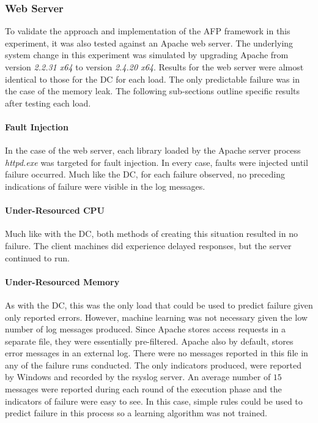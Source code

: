 \subsubsection{Web Server}
To validate the approach and implementation of the \ac{AFP} framework in this
experiment, it was also tested against an Apache web server.  The underlying
system change in this experiment was simulated by upgrading Apache from version
\emph{2.2.31 x64} to version \emph{2.4.20 x64}.  Results for the web server
were almost identical to those for the \ac{DC} for each load.  The only
predictable failure was in the case of the memory leak.  The following
sub-sections outline specific results after testing each load.

\paragraph{Fault Injection}
In the case of the web server, each library loaded by the Apache server process
\emph{httpd.exe} was targeted for fault injection.  In every case, faults were
injected until failure occurred.  Much like the \ac{DC}, for each failure
observed, no preceding indications of failure were visible in the log messages.

\paragraph{Under-Resourced CPU}
Much like with the \ac{DC}, both methods of creating this situation resulted in
no failure.  The client machines did experience delayed responses, but the
server continued to run.

\paragraph{Under-Resourced Memory}
As with the \ac{DC}, this was the only load that could be used to predict
failure given only reported errors.  However, machine learning was not
necessary given the low number of log messages produced.  Since Apache stores
access requests in a separate file, they were essentially pre-filtered.  Apache
also by default, stores error messages in an external log.  There were no
messages reported in this file in any of the failure runs conducted.  The only
indicators produced, were reported by Windows and recorded by the rsyslog
server.  An average number of $15$ messages were reported during each round of
the execution phase and the indicators of failure were easy to see.  In this
case, simple rules could be used to predict failure in this process so a
learning algorithm was not trained.  

